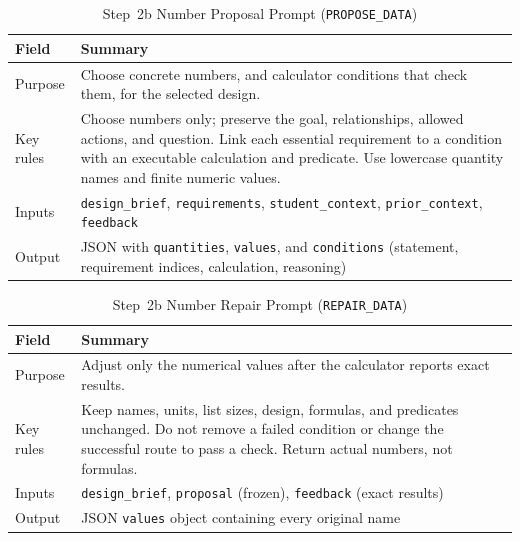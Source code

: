 \begin{table}[!htb]
\centering
\caption[Step 2b Number Proposal Prompt (\texttt{PROPOSE\_DATA})]{Step~2b Number Proposal Prompt (\texttt{PROPOSE\_DATA})}
\label{tab:app-structpf-2b-propose}
\footnotesize
\setlength{\tabcolsep}{4.5pt}
\renewcommand{\arraystretch}{1.16}
\begin{tabular}{@{} >{\raggedright\arraybackslash}p{} >{\raggedright\arraybackslash}p{} @{}}
\toprule
\textbf{Field} & \textbf{Summary} \\
\midrule
Purpose & Choose concrete numbers, and calculator conditions that check them, for the selected design. \\
Key rules & Choose numbers only; preserve the goal, relationships, allowed actions, and question. \newline Link each essential requirement to a condition with an executable calculation and predicate. \newline Use lowercase quantity names and finite numeric values. \\
Inputs & \texttt{design\_brief}, \texttt{requirements}, \texttt{student\_context}, \texttt{prior\_context}, \texttt{feedback} \\
Output & JSON with \texttt{quantities}, \texttt{values}, and \texttt{conditions} (statement, requirement indices, calculation, reasoning) \\
\bottomrule
\end{tabular}
\end{table}

\begin{table}[!htb]
\centering
\caption[Step 2b Number Repair Prompt (\texttt{REPAIR\_DATA})]{Step~2b Number Repair Prompt (\texttt{REPAIR\_DATA})}
\label{tab:app-structpf-2b-repair}
\footnotesize
\setlength{\tabcolsep}{4.5pt}
\renewcommand{\arraystretch}{1.16}
\begin{tabular}{@{} >{\raggedright\arraybackslash}p{} >{\raggedright\arraybackslash}p{} @{}}
\toprule
\textbf{Field} & \textbf{Summary} \\
\midrule
Purpose & Adjust only the numerical values after the calculator reports exact results. \\
Key rules & Keep names, units, list sizes, design, formulas, and predicates unchanged. \newline Do not remove a failed condition or change the successful route to pass a check. \newline Return actual numbers, not formulas. \\
Inputs & \texttt{design\_brief}, \texttt{proposal} (frozen), \texttt{feedback} (exact results) \\
Output & JSON \texttt{values} object containing every original name \\
\bottomrule
\end{tabular}
\end{table}

